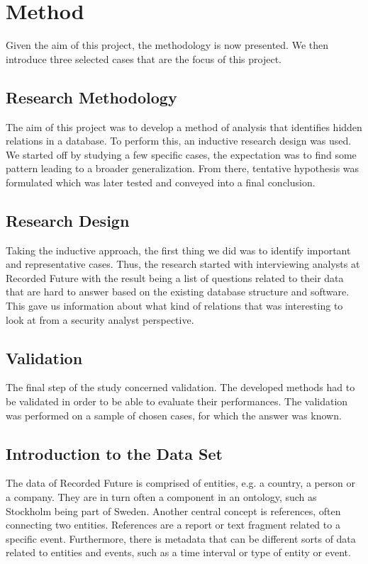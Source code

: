 \chapter{Method}
Given the aim of this project, the methodology is now presented. We then introduce three selected cases that are the focus of this project.

\section{Research Methodology}
The aim of this project was to develop a method of analysis that identifies hidden relations in a database. To perform this, an inductive research design was used. We started off by studying a few specific cases, the expectation was to find some pattern leading to a broader generalization. From there, tentative hypothesis was formulated which was later tested and conveyed into a final conclusion.

\section{Research Design}
Taking the inductive approach, the first thing we did was to identify important and representative cases. Thus, the research started with interviewing analysts at Recorded Future with the result being a list of questions related to their data that are hard to answer based on the existing database structure and software. This gave us information about what kind of relations that was interesting to look at from a security analyst perspective.

\section{Validation} 
The final step of the study concerned validation. The developed methods had to be validated in order to be able to evaluate their performances. The validation was performed on a sample of chosen cases, for which the answer was known.

\section{Introduction to the Data Set \label{dataset}}
The data of Recorded Future is comprised of entities, e.g. a country, a person or a company. They are in turn often a component in an ontology, such as Stockholm being part of Sweden. Another central concept is references, often connecting two entities. References are a report or text fragment related to a specific event. Furthermore, there is metadata that can be different sorts of data related to entities and events, such as a time interval or type of entity or event.

